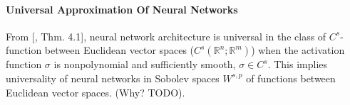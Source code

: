 \documentclass[reqno]{amsart}
\theoremstyle{plain}
\theoremstyle{definition}
\newcommand{\bb}[1]{\mathbb{#1}}
\begin{document}
\paragraph{\bf Universal Approximation Of Neural Networks}
From [\cite{AP1999}, Thm. 4.1], neural network architecture is universal in the class of $C^s$- function between Euclidean vector spaces ($C^s(\bb R^n; \bb R^m)$) when the activation function $\sigma$ is nonpolynomial and sufficiently smooth, $\sigma \in C^s$. This implies universality of neural networks in Sobolev spaces $W^{s,p}$ of functions between Euclidean vector spaces. (Why? TODO).


\end{document}
